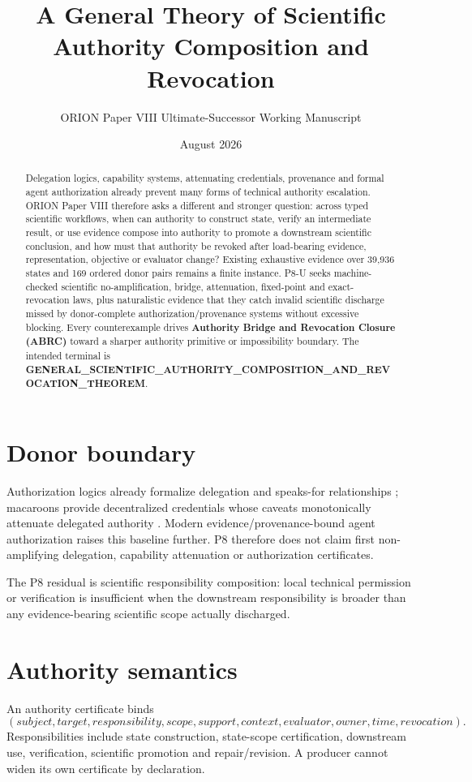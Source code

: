 \documentclass[11pt]{article}
\title{A General Theory of Scientific Authority Composition and Revocation}
\author{ORION Paper VIII Ultimate-Successor Working Manuscript}
\date{August 2026}
\begin{document}
\maketitle

\begin{abstract}
Delegation logics, capability systems, attenuating credentials, provenance and formal agent authorization already prevent many forms of technical authority escalation. ORION Paper VIII therefore asks a different and stronger question: across typed scientific workflows, when can authority to construct state, verify an intermediate result, or use evidence compose into authority to promote a downstream scientific conclusion, and how must that authority be revoked after load-bearing evidence, representation, objective or evaluator change? Existing exhaustive evidence over 39,936 states and 169 ordered donor pairs remains a finite instance. P8-U seeks machine-checked scientific no-amplification, bridge, attenuation, fixed-point and exact-revocation laws, plus naturalistic evidence that they catch invalid scientific discharge missed by donor-complete authorization/provenance systems without excessive blocking. Every counterexample drives \textbf{Authority Bridge and Revocation Closure (ABRC)} toward a sharper authority primitive or impossibility boundary. The intended terminal is \textbf{GENERAL\_SCIENTIFIC\_AUTHORITY\_COMPOSITION\_AND\_REVOCATION\_THEOREM}.
\end{abstract}

\section{Donor boundary}
Authorization logics already formalize delegation and speaks-for relationships \cite{authlogic}; macaroons provide decentralized credentials whose caveats monotonically attenuate delegated authority \cite{macaroons2014}. Modern evidence/provenance-bound agent authorization raises this baseline further. P8 therefore does not claim first non-amplifying delegation, capability attenuation or authorization certificates.

The P8 residual is scientific responsibility composition: local technical permission or verification is insufficient when the downstream responsibility is broader than any evidence-bearing scientific scope actually discharged.

\section{Authority semantics}
An authority certificate binds
\[
(subject,target,responsibility,scope,support,context,evaluator,owner,time,revocation).
\]
Responsibilities include state construction, state-scope certification, downstream use, verification, scientific promotion and repair/revision. A producer cannot widen its own certificate by declaration.
\end{document}
